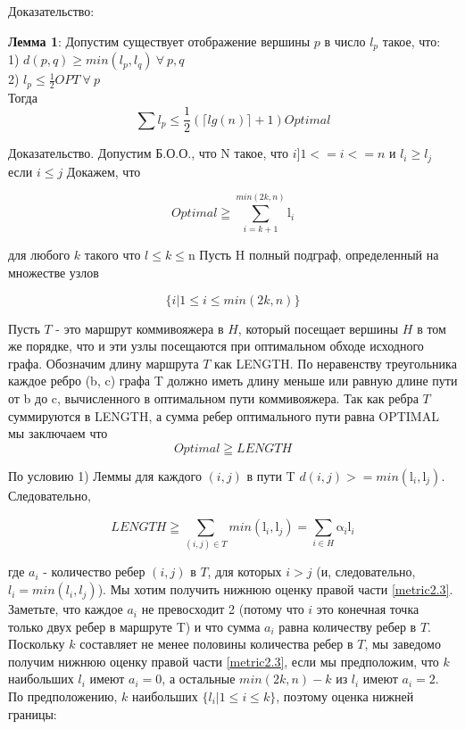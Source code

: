 \documentclass[a4paper, 14pt]{extarticle}
\begin{document}
Доказательство:

\textbf{Лемма 1}: Допустим существует отображение вершины $p$ в число $l_p$ такое, что:\\
1) $d(p,q) \geq min(l_p, l_q) \: \forall \: p,q$\\
2) $l_p \leq \frac{1}{2}OPT\: \forall \: p $\\
Тогда 
\begin{equation}
\sum l_p \leq \frac{1}{2}(\lceil lg(n)\rceil+1)Optimal
\end{equation}

Доказательство.
Допустим Б.О.О., что N такое, что  ${i ]1<=i<= n }$  и $l_i \geq l_j$ если $i \leq j$
Докажем, что 

\begin{equation}\label{metriclowerbound}
	{Optimal} \geqq \sum_{i=k+1}^{min(2k,n)}\mathrm{l}_i
\end{equation}

для любого $k$ такого что $l \leq k \leq $n
Пусть H полный подграф, определенный на множестве узлов

\begin{equation}
	{\{i|1 \leq i \leq min(2k, n)\}}
\end{equation}

Пусть $T$ - это маршрут коммивояжера в $H$, который посещает вершины $H$ в том же порядке, что и эти узлы посещаются при оптимальном обходе исходного графа. Обозначим длину маршрута $T$ как LENGTH. По неравенству треугольника каждое ребро (b, c) графа T должно иметь длину меньше или равную длине пути от b до c, вычисленного в оптимальном пути коммивояжера. Так как ребра $T$ суммируются в LENGTH, а сумма ребер оптимального пути равна OPTIMAL мы заключаем что
\begin{equation}
	{Optimal} \geqq {LENGTH}
\end{equation}

По условию 1) Леммы для каждого $(i, j)$ в пути T  $d (i, j)> = min (\mathrm{l}_i, \mathrm{l}_j)$. Следовательно,

\begin{equation}\label{metric2.3}
	{LENGTH} \geqq \sum_{(i,j)\in T}^{}min(\mathrm{l}_i,\mathrm{l}_j ) = \sum_{i\in H}^{} \mathrm{\alpha}_i\mathrm{l}_i
\end{equation}

где $a_i$ - количество ребер $(i, j)$ в $T$, для которых $i > j$ (и, следовательно, $l_i=min(l_i, l_j)$).
Мы хотим получить нижнюю оценку правой части \ref{metric2.3}. Заметьте, что каждое $a_i$ не превосходит 2 (потому что $i$ это конечная точка только двух ребер в маршруте T) и что сумма $a_i$ равна количеству ребер в $T$. Поскольку $k$ составляет не менее половины количества ребер в $T$, мы заведомо получим нижнюю оценку правой части \ref{metric2.3}, если мы предположим, что $k$ наибольших $l_i$ имеют $a_i=0$, а остальные $min (2k, n) - k$ из $l_i$ имеют $a_i= 2$. По предположению, $k$ наибольших $\{ l_i|1 \leq i \leq k\}$, поэтому оценка нижней границы:
\end{document}
